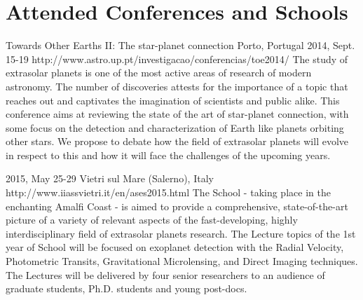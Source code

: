 \section{Attended Conferences and Schools}

{Towards Other Earths II: The star-planet connection}%
{Porto, Portugal}%
{2014, Sept. 15-19}%
{http://www.astro.up.pt/investigacao/conferencias/toe2014/}%
{}%
{The study of extrasolar planets is one of the most active areas of research of modern astronomy. The number of discoveries attests for the importance of a topic that reaches out and captivates the imagination of scientists and public alike. This conference aims at reviewing the state of the art of star-planet connection, with some focus on the detection and characterization of Earth like planets orbiting other stars. We propose to debate how the field of extrasolar planets will evolve in respect to this and how it will face the challenges of the upcoming years.}%

{2015, May 25-29}%
{Vietri sul Mare (Salerno), Italy}%
{http://www.iiassvietri.it/en/ases2015.html}%
{}%
{The School - taking place in the enchanting Amalfi Coast - is aimed to provide a comprehensive, state-of-the-art picture of a variety of relevant aspects of the fast-developing, highly interdisciplinary field of extrasolar planets research.
The Lecture topics of the 1st year of School will be focused on exoplanet detection with the Radial Velocity, Photometric Transits, Gravitational Microlensing, and Direct Imaging techniques. The Lectures will be delivered by four senior researchers to an audience of graduate students, Ph.D. students and young post-docs.}%

